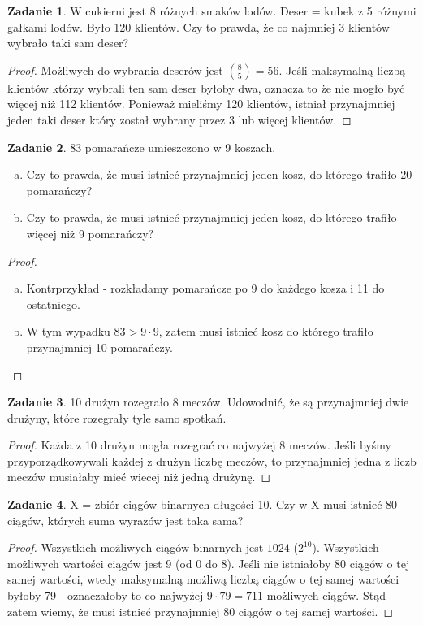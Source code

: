 \documentclass[11pt]{article}
\theoremstyle{definition}
\newtheorem{zadanie}{Zadanie}
\numberwithin{zadanie}{subsection}
\begin{document}
\begin{zadanie}
    W cukierni jest 8 różnych smaków lodów. Deser = kubek z 5 różnymi gałkami lodów. Było 120 klientów. Czy to prawda, że co najmniej 3 klientów wybrało taki sam deser?
\end{zadanie}
\begin{proof}
    Możliwych do wybrania deserów jest $\binom85 = 56$. Jeśli maksymalną liczbą klientów którzy wybrali ten sam deser byłoby dwa, oznacza to że nie mogło być więcej niż 112 klientów. Ponieważ mieliśmy 120 klientów, istniał przynajmniej jeden taki deser który został wybrany przez 3 lub więcej klientów.
\end{proof}


\begin{zadanie}
    83 pomarańcze umieszczono w 9 koszach.
    \begin{enumerate}[a)]
        \item Czy to prawda, że musi istnieć przynajmniej jeden kosz, do którego trafiło 20 pomarańczy?
        \item Czy to prawda, że musi istnieć przynajmniej jeden kosz, do którego trafiło więcej niż 9 pomarańczy?
    \end{enumerate}
\end{zadanie}
\begin{proof}
    \begin{enumerate}[a)]
        \item Kontrprzykład - rozkładamy pomarańcze po 9 do każdego kosza i 11 do ostatniego.
        \item W tym wypadku $83 > 9\cdot 9$, zatem musi istnieć kosz do którego trafiło przynajmniej 10 pomarańczy.
    \end{enumerate}
\end{proof}

\begin{zadanie}
    10 drużyn rozegrało 8 meczów. Udowodnić, że są przynajmniej dwie drużyny, które rozegrały tyle samo spotkań.
\end{zadanie}
\begin{proof}
    Każda z 10 drużyn mogła rozegrać co najwyżej 8 meczów. Jeśli byśmy przyporządkowywali każdej z drużyn liczbę meczów, to przynajmniej jedna z liczb meczów musiałaby mieć wiecej niż jedną drużynę.
\end{proof}


\begin{zadanie}
    X = zbiór ciągów binarnych długości 10. Czy w X musi istnieć 80 ciągów, których suma wyrazów jest taka sama?
\end{zadanie}
\begin{proof}
    Wszystkich możliwych ciągów binarnych jest $1024$ ($2^{10}$). Wszystkich możliwych wartości ciągów jest 9 (od 0 do 8). Jeśli nie istniałoby 80 ciągów o tej samej wartości, wtedy maksymalną możliwą liczbą ciągów o tej samej wartości byłoby 79 - oznaczałoby to co najwyżej $9\cdot79=711$ możliwych ciągów. Stąd zatem wiemy, że musi istnieć przynajmniej 80 ciągów o tej samej wartości.
\end{proof}
\end{document}
